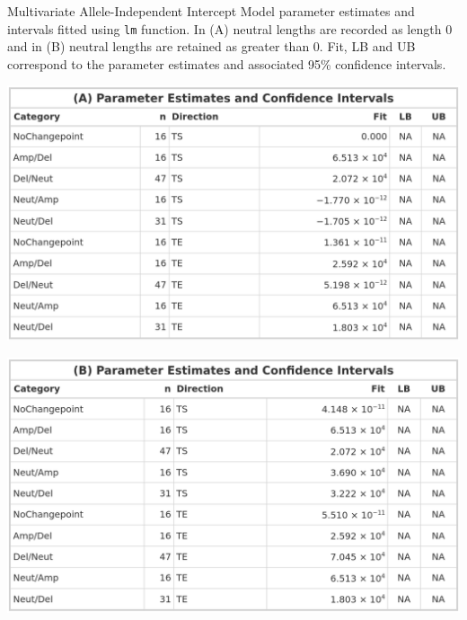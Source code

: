 \vfill 
\begin{table}[H]
    \caption[Multivariate Allele-Independent Intercept Model parameter estimates and intervals fitted using \texttt{lm} function.]{Multivariate Allele-Independent Intercept Model parameter estimates and intervals fitted using \texttt{lm} function. In (A) neutral lengths are recorded as length 0 and in (B) neutral lengths are retained as greater than 0. Fit, LB and UB correspond to the parameter estimates and associated 95\% confidence intervals. }
    \label{tbl:lm_multi_1_pred}
     \begin{subtable}[t]{.49\textwidth}
      \centering
      \includegraphics[width = 1\textwidth]{../tables/Chapter_5/Multivariate_lm_7_AI_Pred.png}
    \end{subtable}%
    \hspace{0.5cm}
     \begin{subtable}[t]{.49\textwidth}
      \centering
         \includegraphics[width = 1\textwidth]{../tables/Chapter_5/Multivariate_lm_7_Neut_AI_Pred.png}
    \end{subtable} 
\end{table}

